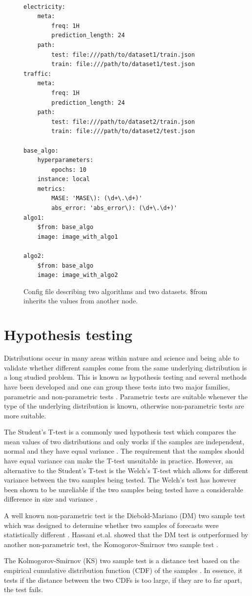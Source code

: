 \begin{figure}
    \begin{lstlisting}[]

electricity:
    meta:
        freq: 1H
        prediction_length: 24
    path:
        test: file:///path/to/dataset1/train.json
        train: file:///path/to/dataset1/test.json
traffic:
    meta:
        freq: 1H
        prediction_length: 24
    path:
        test: file:///path/to/dataset2/train.json
        train: file:///path/to/dataset2/test.json

base_algo:
    hyperparameters:
        epochs: 10
    instance: local
    metrics: 
        MASE: 'MASE\): (\d+\.\d+)'
        abs_error: 'abs_error\): (\d+\.\d+)'
algo1:
    $from: base_algo
    image: image_with_algo1

algo2:
    $from: base_algo
    image: image_with_algo2

\end{lstlisting}
    \caption{Config file describing two algorithms and two datasets. \$from inherits the values from another node.}
    \label{fig:example_config}
\end{figure}
\clearpage


\section{Hypothesis testing}
Distributions occur in many areas within nature and science and being able to validate whether different samples come from the same underlying distribution is a long studied problem.  This is known as hypothesis testing and several methods have been developed and one can group these tests into two major families, parametric and non-parametric tests \cite{kim2015t}. Parametric tests are suitable whenever the type of the underlying distribution is known, otherwise non-parametric tests are more suitable.

The Student's T-test is a commonly used hypothesis test which compares the mean values of two distributions and only works if the samples are independent, normal and they have equal variance \cite{kim2015t}. The requirement that the samples should have equal variance can make the T-test unsuitable in practice. However, an alternative to the Student's T-test is the Welch’s T-test which allows for different variance between the two samples being tested. The Welch’s test has however been shown to be unreliable if the two samples being tested have a considerable difference in size and variance \cite{student_or_welch}.

A well known non-parametric test is the Diebold-Mariano (DM) two sample test which was designed to determine whether two samples of forecasts were statistically different \cite{diebold2015comparing}. Hassani et.al. showed that the DM test is outperformed by another non-parametric test, the Komogorov-Smirnov two sample test \cite{hassani2015kolmogorov}.

The Kolmogorov-Smirnov (KS) two sample test is a distance test based on the empirical cumulative distribution function (CDF) of the samples \cite{massey1951kolmogorov}. In essence, it tests if the distance between the two CDFs is too large, if they are to far apart, the test fails.

